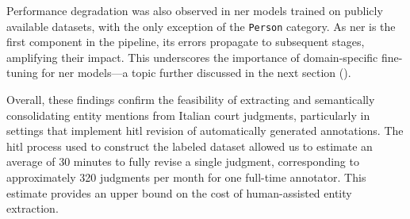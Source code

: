 Performance degradation was also observed in \ac{ner} models trained on publicly available datasets, with the only exception of the \texttt{Person} category. As \ac{ner} is the first component in the pipeline, its errors propagate to subsequent stages, amplifying their impact. This underscores the importance of domain-specific fine-tuning for \ac{ner} models---a topic further discussed in the next section ().

Overall, these findings confirm the feasibility of extracting and semantically consolidating entity mentions from Italian court judgments, particularly in settings that implement \acl{hitl} revision of automatically generated annotations. The \ac{hitl} process used to construct the labeled dataset allowed us to estimate an average of 30 minutes to fully revise a single judgment, corresponding to approximately 320 judgments per month for one full-time annotator. This estimate provides an upper bound on the cost of human-assisted entity extraction.


\clearpage
\FloatBarrier